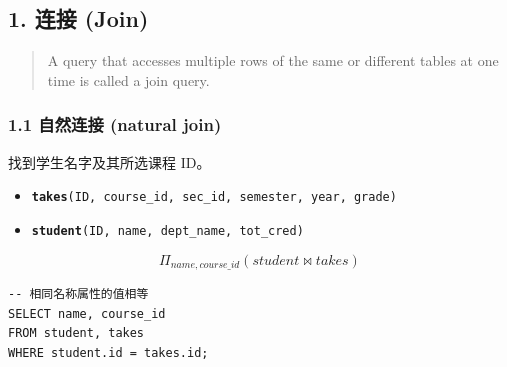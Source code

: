 \documentclass[aspectratio=169, 14pt]{beamer}
\begin{document}
{
    \begin{frame}
        \section{\textcolor{darkmidnightblue}{1. 连接 (Join)}}

        \begin{quote}
            A query that accesses multiple rows of the same or different tables at one time is called a \alert{join query}.            
        \end{quote}
    \end{frame}

}

\begin{frame}[fragile]
    \frametitle{1.1 自然连接 (natural join)}
找到学生名字及其所选课程 ID。   

\begin{itemize}
    \item \texttt{\textbf{takes}(ID, course\_id, sec\_id, semester, year, grade)}
    \item  \texttt{\textbf{student}(ID, name, dept\_name, tot\_cred)}
\end{itemize}
\[\Pi_{name, course\_id}(student \Join takes)\] 

\pause
\begin{verbatim}
-- 相同名称属性的值相等
SELECT name, course_id
FROM student, takes
WHERE student.id = takes.id;
\end{verbatim}

\end{frame}
\end{document}
